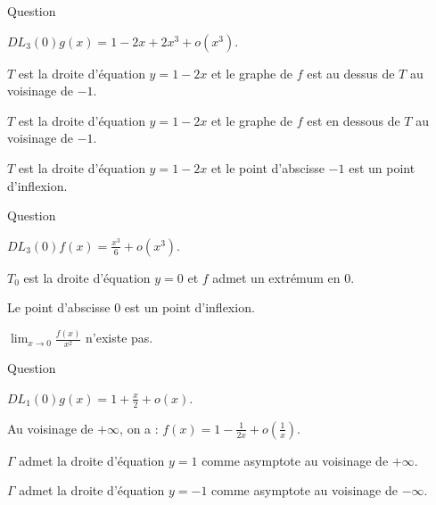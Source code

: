 \begin{multi}[multiple,feedback=
{D'abord \(\displaystyle g(x)=\frac{1-2x+x^2}{1+x^2}=1-2x+2x^3+o(x^3)\). On en déduit que
\[\displaystyle DL_3(-1)f(x)=1-2(x+1)+2(x+1)^3+o\left((x+1)^3\right).\]
Donc \(T\) est la droite d'équation \(y=1-2(x+1)\) et le point d'abscisse \(-1\) est un point d'inflexion.
}]{Question}
    \item* \(\displaystyle DL_3(0)g(x)=1-2x+2x^3+o(x^3)\).
    \item \(T\) est la droite d'équation \(y=1-2x\) et le graphe de \(f\) est au dessus de \(T\) au voisinage de \(-1\).
    \item \(T\) est la droite d'équation \(y=1-2x\) et le graphe de \(f\) est en dessous de \(T\) au voisinage de \(-1\).
    \item \(T\) est la droite d'équation \(y=1-2x\) et le point d'abscisse \(-1\) est un point d'inflexion.
\end{multi}


\begin{multi}[multiple,feedback=
{Le \(DL_3(0)\sin x\) donne \(\displaystyle DL_3(0)f(x)=\frac{x^3}{6}+o(x^3)\). Donc \(T_0\) est la droite d'équation \(y=0\). Or, au voisinage de \(0\), on a :
\[f(x)-y=\frac{x^3}{6}+o(x^3).\]
Ce qui implique que le point d'abscisse \(0\) est un point d'inflexion. Enfin, 
\[\displaystyle \lim _{x\to 0}\frac{f(x)}{x^2}=\lim _{x\to 0}\left(\frac{x}{6}+o(x)\right)=0.\]
}]{Question}
    \item* \(\displaystyle DL_3(0)f(x)=\frac{x^3}{6}+o(x^3)\).
    \item \(T_0\) est la droite d'équation \(y=0\) et \(f\) admet un extrémum en \(0\).
    \item* Le point d'abscisse \(0\) est un point d'inflexion.
    \item \(\displaystyle \lim _{x\to 0}\frac{f(x)}{x^2}\) n'existe pas.
\end{multi}


\begin{multi}[multiple,feedback=
{D'abord, \(\displaystyle g(x)=\frac{\ln (1+x)}{x}=1-\frac{x}{2}+o(x)\). Donc, au voisinage de \(\pm\infty\), on a :
\[f(x)=1-\frac{1}{2x}+o\left(\frac{1}{x}\right)\mbox{ car }f(x)=g\left(\frac{1}{x}\right).\]
La droite d'équation \(y=1\) est une asymptote au voisinage de \(\pm\infty\).
}]{Question}
    \item \(\displaystyle DL_1(0)g(x)=1+\frac{x}{2}+o(x)\).
    \item* Au voisinage de \(+\infty\), on a : \(\displaystyle f(x)=1-\frac{1}{2x}+o\left(\frac{1}{x}\right)\).
    \item* \(\Gamma\) admet la droite d'équation \(y=1\) comme asymptote au voisinage de \(+\infty\).
    \item \(\Gamma\) admet la droite d'équation \(y=-1\) comme asymptote au voisinage de \(-\infty\).
\end{multi}


